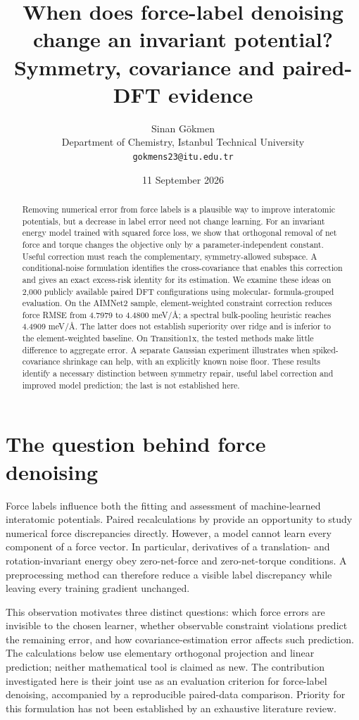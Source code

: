 \documentclass[11pt]{article}
\title{When does force-label denoising change an invariant potential?\\[3pt]
\large Symmetry, covariance and paired-DFT evidence}
\author{Sinan G\"okmen\\Department of Chemistry, Istanbul Technical University\\
\texttt{gokmens23@itu.edu.tr}}
\date{11 September 2026}
\begin{document}
\maketitle
\begin{abstract}
Removing numerical error from force labels is a plausible way to improve interatomic
potentials, but a decrease in label error need not change learning. For an invariant
energy model trained with squared force loss, we show that orthogonal removal of
net force and torque changes the objective only by a parameter-independent constant.
Useful correction must reach the complementary, symmetry-allowed subspace. A
conditional-noise formulation identifies the cross-covariance that enables this
correction and gives an exact excess-risk identity for its estimation. We examine
these ideas on 2,000 publicly available paired DFT configurations using molecular-
formula-grouped evaluation. On the AIMNet2 sample, element-weighted constraint
correction reduces force RMSE from 4.7979 to 4.4800 meV/\AA; a spectral bulk-pooling
heuristic reaches 4.4909 meV/\AA. The latter does not establish superiority over ridge
and is inferior to the element-weighted baseline. On Transition1x, the tested methods
make little difference to aggregate error. A separate Gaussian experiment illustrates
when spiked-covariance shrinkage can help, with an explicitly known noise floor.
These results identify a necessary distinction between symmetry repair, useful label
correction and improved model prediction; the last is not established here.
\end{abstract}

\section{The question behind force denoising}
Force labels influence both the fitting and assessment of machine-learned interatomic
potentials. Paired recalculations by \citet{kuryla2025} provide an opportunity to study
numerical force discrepancies directly. However, a model cannot learn every component
of a force vector. In particular, derivatives of a translation- and rotation-invariant
energy obey zero-net-force and zero-net-torque conditions. A preprocessing method can
therefore reduce a visible label discrepancy while leaving every training gradient
unchanged.

This observation motivates three distinct questions: which force errors are invisible
to the chosen learner, whether observable constraint violations predict the remaining
error, and how covariance-estimation error affects such prediction. The calculations
below use elementary orthogonal projection and linear prediction; neither mathematical
tool is claimed as new. The contribution investigated here is their joint use as an
evaluation criterion for force-label denoising, accompanied by a reproducible paired-data
comparison. Priority for this formulation has not been established by an exhaustive
literature review.
\end{document}
